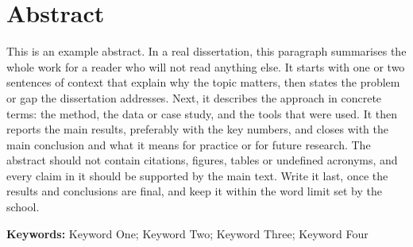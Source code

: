 \chapter*{Abstract}

This is an example abstract. In a real dissertation, this paragraph
summarises the whole work for a reader who will not read anything else. It
starts with one or two sentences of context that explain why the topic
matters, then states the problem or gap the dissertation addresses. Next, it
describes the approach in concrete terms: the method, the data or case
study, and the tools that were used. It then reports the main results,
preferably with the key numbers, and closes with the main conclusion and
what it means for practice or for future research. The abstract should not
contain citations, figures, tables or undefined acronyms, and every claim in
it should be supported by the main text. Write it last, once the results and
conclusions are final, and keep it within the word limit set by the school.

\vspace{1em}
\noindent\textbf{Keywords:} Keyword One; Keyword Two; Keyword Three; Keyword Four
